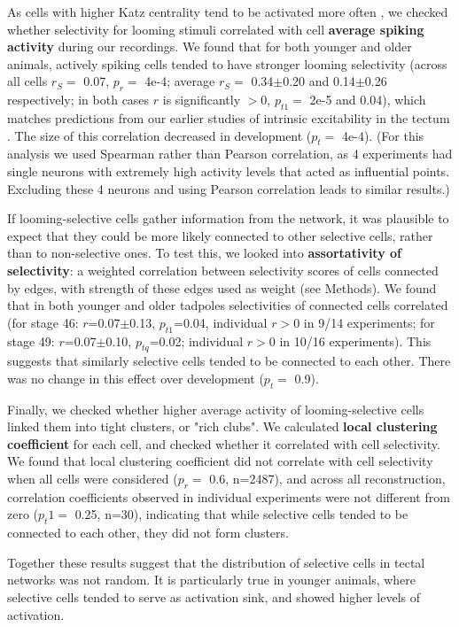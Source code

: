 \documentclass{article}
\begin{document}
As cells with higher Katz centrality tend to be activated more often \citep{fletcher2018katz}, we checked whether selectivity for looming stimuli correlated with cell \textbf{average spiking activity} during our recordings. We found that for both younger and older animals, actively spiking cells tended to have stronger looming selectivity (across all cells $r_S=$ 0.07, $p_r=$ 4e-4; average $r_S =$ 0.34$\pm$0.20 and 0.14$\pm$0.26 respectively; in both cases $r$ is significantly $>0$, $p_{t1}=$ 2e-5 and 0.04), which matches predictions from our earlier studies of intrinsic excitability in the tectum \citep{busch2019}. The size of this correlation decreased in development ($p_t=$ 4e-4). (For this analysis we used Spearman rather than Pearson correlation, as 4 experiments had single neurons with extremely high activity levels that acted as influential points. Excluding these 4 neurons and using Pearson correlation leads to similar results.) 

If looming-selective cells gather information from the network, it was plausible to expect that they could be more likely connected to other selective cells, rather than to non-selective ones. To test this, we looked into \textbf{assortativity of selectivity}: a weighted correlation between selectivity scores of cells connected by edges, with strength of these edges used as weight (see Methods). We found that in both younger and older tadpoles selectivities of connected cells correlated (for stage 46: $r$=0.07$\pm$0.13, $p_{t1}$=0.04, individual $r>$0 in 9/14 experiments; for stage 49: $r$=0.07$\pm$0.10, $p_{tq}$=0.02; individual $r>$0 in 10/16 experiments). This suggests that similarly selective cells tended to be connected to each other. There was no change in this effect over development ($p_t=$ 0.9).


Finally, we checked whether higher average activity of looming-selective cells linked them into tight clusters, or "rich clubs". We calculated \textbf{local clustering coefficient} for each cell, and checked whether it correlated with cell selectivity. We found that local clustering coefficient did not correlate with cell selectivity when all cells were considered ($p_r=$ 0.6, n=2487), and across all reconstruction, correlation coefficients observed in individual experiments were not different from zero ($p_t1=$ 0.25, n=30), indicating that while selective cells tended to be connected to each other, they did not form clusters.

Together these results suggest that the distribution of selective cells in tectal networks was not random. It is particularly true in younger animals, where selective cells tended to serve as activation sink, and showed higher levels of activation.
\end{document}
